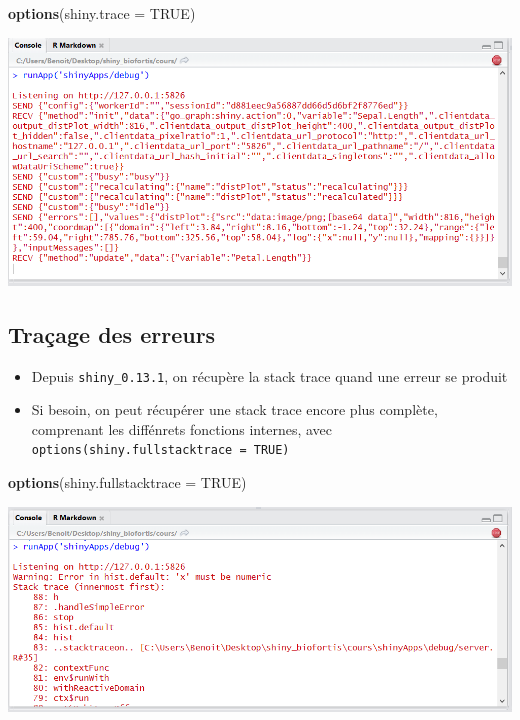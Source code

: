 \documentclass[]{article}
\newenvironment{Shaded}{\begin{snugshade}}{\end{snugshade}}
\newcommand{\KeywordTok}[1]{\textcolor[rgb]{0.13,0.29,0.53}{\textbf{#1}}}
\newcommand{\DataTypeTok}[1]{\textcolor[rgb]{0.13,0.29,0.53}{#1}}
\newcommand{\OtherTok}[1]{\textcolor[rgb]{0.56,0.35,0.01}{#1}}
\newcommand{\NormalTok}[1]{#1}
\providecommand{\tightlist}{%
  \setlength{\itemsep}{0pt}\setlength{\parskip}{0pt}}
\begin{document}
\begin{Shaded}
\begin{Highlighting}[]
\KeywordTok{options}\NormalTok{(}\DataTypeTok{shiny.trace =} \OtherTok{TRUE}\NormalTok{) }
\end{Highlighting}
\end{Shaded}

\includegraphics{img/debug_trace.png}

\subsection{Traçage des erreurs}\label{tracage-des-erreurs}

\begin{itemize}
\tightlist
\item
  Depuis \texttt{shiny\_0.13.1}, on récupère la stack trace quand une
  erreur se produit
\item
  Si besoin, on peut récupérer une stack trace encore plus complète,
  comprenant les diffénrets fonctions internes, avec
  \texttt{options(shiny.fullstacktrace\ =\ TRUE)}
\end{itemize}

\begin{Shaded}
\begin{Highlighting}[]
\KeywordTok{options}\NormalTok{(}\DataTypeTok{shiny.fullstacktrace =} \OtherTok{TRUE}\NormalTok{)}
\end{Highlighting}
\end{Shaded}

\includegraphics{img/debug_stack.png}
\end{document}
